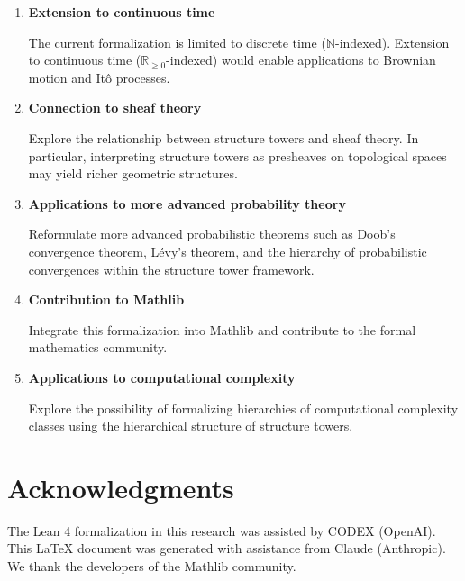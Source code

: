 \documentclass[11pt,a4paper]{article}
\theoremstyle{plain}
\theoremstyle{definition}
\newcommand{\NN}{\mathbb{N}}
\newcommand{\RR}{\mathbb{R}}
\begin{document}
\begin{enumerate}[label=\textbf{(\arabic*)}]
  \item \textbf{Extension to continuous time}
  
  The current formalization is limited to discrete time ($\NN$-indexed).
  Extension to continuous time ($\RR_{\geq 0}$-indexed) would enable 
  applications to Brownian motion and It\^o processes.
  
  \item \textbf{Connection to sheaf theory}
  
  Explore the relationship between structure towers and sheaf theory.
  In particular, interpreting structure towers as presheaves on topological 
  spaces may yield richer geometric structures.
  
  \item \textbf{Applications to more advanced probability theory}
  
  Reformulate more advanced probabilistic theorems such as Doob's 
  convergence theorem, L\'evy's theorem, and the hierarchy of 
  probabilistic convergences within the structure tower framework.
  
  \item \textbf{Contribution to Mathlib}
  
  Integrate this formalization into Mathlib and contribute to the 
  formal mathematics community.
  
  \item \textbf{Applications to computational complexity}
  
  Explore the possibility of formalizing hierarchies of computational 
  complexity classes using the hierarchical structure of structure towers.
\end{enumerate}

\section*{Acknowledgments}

The Lean 4 formalization in this research was assisted by CODEX (OpenAI).
This \LaTeX{} document was generated with assistance from Claude (Anthropic).
We thank the developers of the Mathlib community.
\end{document}
